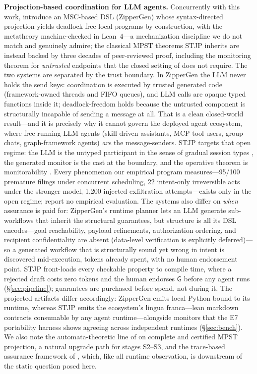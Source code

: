 \documentclass{article}
\newcommand{\gtG}{\mathsf{G}}
\newcommand{\stjp}{\textsc{STJP}}
\begin{document}
\textbf{Projection-based coordination for LLM agents.} Concurrently with this work, \citet{bollig26} introduce an MSC-based DSL (ZipperGen) whose syntax-directed projection yields deadlock-free local programs by construction, with the metatheory machine-checked in Lean~4---a mechanization discipline we do not match and genuinely admire; the classical MPST theorems \stjp{} inherits are instead backed by three decades of peer-reviewed proof, including the monitoring theorem for \emph{untrusted} endpoints \citep{bocchi13} that the closed setting of \citet{bollig26} does not require. The two systems are separated by the trust boundary. In ZipperGen the LLM never holds the send keys: coordination is executed by trusted generated code (framework-owned threads and FIFO queues), and LLM calls are opaque typed functions inside it; deadlock-freedom holds because the untrusted component is structurally incapable of sending a message at all. That is a clean closed-world result---and it is precisely why it cannot govern the deployed agent ecosystem, where free-running LLM agents (skill-driven assistants, MCP tool users, group chats, graph-framework agents) \emph{are} the message-senders. \stjp{} targets that open regime: the LLM is the untyped participant in the sense of gradual session types \citep{igarashi17}, the generated monitor is the cast at the boundary, and the operative theorem is monitorability \citep{bocchi13}. Every phenomenon our empirical program measures---95/100 premature filings under concurrent scheduling, 22 intent-only irreversible acts under the stronger model, 1{,}200 injected exfiltration attempts---exists only in the open regime; \citet{bollig26} report no empirical evaluation. The systems also differ on \emph{when} assurance is paid for: ZipperGen's runtime planner lets an LLM generate sub-workflows that inherit the structural guarantees, but structure is all its DSL encodes---goal reachability, payload refinements, authorization ordering, and recipient confidentiality are absent (data-level verification is explicitly deferred)---so a generated workflow that is structurally sound yet wrong in intent is discovered mid-execution, tokens already spent, with no human endorsement point. \stjp{} front-loads every checkable property to compile time, where a rejected draft costs zero tokens and the human endorses $\gtG$ before any agent runs (\S\ref{sec:pipeline}); guarantees are purchased before spend, not during it. The projected artifacts differ accordingly: ZipperGen emits local Python bound to its runtime, whereas \stjp{} emits the ecosystem's lingua franca---lean markdown contracts consumable by any agent runtime---alongside monitors that the E7 portability harness shows agreeing across independent runtimes (\S\ref{sec:bench}). We also note the automata-theoretic line of \citet{listutz23,li25oopsla,liwies25} on complete and certified MPST projection, a natural upgrade path for stages S2--S3, and the trace-based assurance framework of \citet{paduraru26}, which, like all runtime observation, is downstream of the static question posed here.
\end{document}
